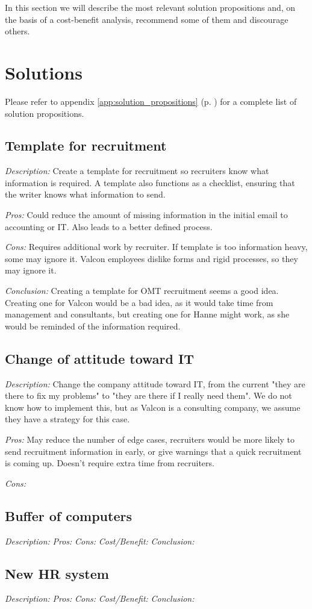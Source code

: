 In this section we will describe the most relevant solution propositions and, on the basis of a cost-benefit analysis, recommend some of them and discourage others.

\section{Solutions}
Please refer to appendix \ref{app:solution_propositions} (p. \pageref{app:solution_propositions}) for a complete list of solution propositions.

\subsection{Template for recruitment}
\emph{Description:} Create a template for recruitment so recruiters know what information is required. A template also functions as a checklist, ensuring that the writer knows what information to send.

\emph{Pros:} Could reduce the amount of missing information in the initial email to accounting or IT. 
Also leads to a better defined process.

\emph{Cons:} Requires additional work by recruiter. 
If template is too information heavy, some may ignore it.
Valcon employees dislike forms and rigid processes, so they may ignore it.

\emph{Conclusion:} Creating a template for OMT recruitment seems a good idea.
Creating one for Valcon would be a bad idea, as it would take time from management and consultants, but creating one for Hanne might work, as she would be reminded of the information required.

\subsection{Change of attitude toward IT}
\emph{Description:} Change the company attitude toward IT, from the current "they are there to fix my problems" to "they are there if I really need them".
We do not know how to implement this, but as Valcon is a consulting company, we assume they have a strategy for this case.

\emph{Pros:} May reduce the number of edge cases, recruiters would be more likely to send recruitment information in early, or give warnings that a quick recruitment is coming up.
Doesn't require extra time from recruiters.

\emph{Cons:} 

\subsection{Buffer of computers}
\emph{Description:}
\emph{Pros:}
\emph{Cons:}
\emph{Cost/Benefit:}
\emph{Conclusion:}

\subsection{New HR system}
\emph{Description:}
\emph{Pros:}
\emph{Cons:}
\emph{Cost/Benefit:}
\emph{Conclusion:}

